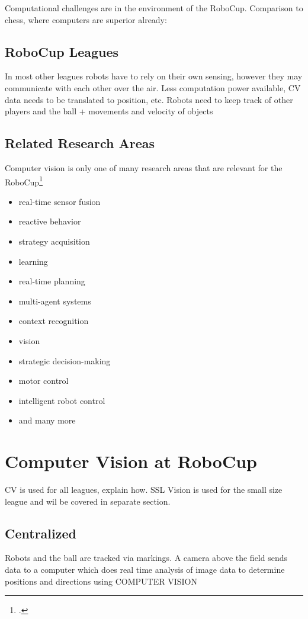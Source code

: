 Computational challenges are in the environment of the RoboCup.
Comparison to chess, where computers are superior already:

\subsection{RoboCup Leagues \label{sec:robo-leagues}}
In most other leagues robots have to rely on their own sensing, however they may communicate with each other over the air.
Less computation power available, CV data needs to be translated to position, etc.
Robots need to keep track of other players and the ball + movements and velocity of objects

\subsection{Related Research Areas \label{sec:robo-research}}
Computer vision is only one of many research areas that are relevant for the
RoboCup\footcite[Cf.][]{robo_objectives}
\begin{itemize}
  \item real-time sensor fusion
  \item reactive behavior
  \item strategy acquisition
  \item learning
  \item real-time planning
  \item multi-agent systems
  \item context recognition
  \item vision
  \item strategic decision-making
  \item motor control
  \item intelligent robot control
  \item and many more
\end{itemize}




\newpage
\section{Computer Vision at RoboCup \label{sec:cv-robo}}

CV is used for all leagues, explain how.
SSL Vision is used for the small size league and wil be covered in separate
section.

\subsection{Centralized}
Robots and the ball are tracked via markings. A camera above the field sends
data to a computer which does real time analysis of image data to determine
positions and directions using COMPUTER VISION

